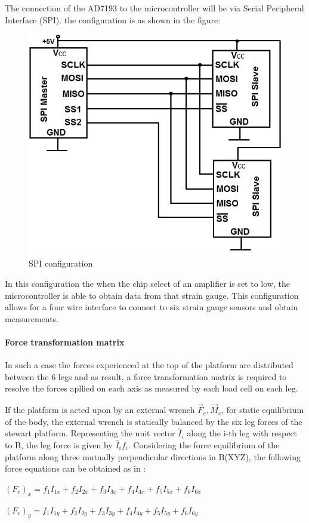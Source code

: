 The connection of the AD7193 to the microcontroller will be via Serial Peripheral Interface (SPI). the configuration is as shown in the figure:
\begin{center}
\begin{figure}
\centering
\includegraphics[width=0.55\linewidth]{Figures/SPI}
\caption[SPI configuration]{SPI configuration}
\end{figure}
\end{center}
In this configuration the when the chip select of an amplifier is set to low, the microcontroller is able to obtain data from that strain gauge. This configuration allows for a four wire interface to connect to six strain gauge sensors and obtain measurements.

\paragraph{Force transformation matrix} 
In such a case the forces experienced at the top of the platform are distributed between the 6 legs and as result, a force transformation matrix is required to resolve the forces apllied on each axis as measured by each load cell on each leg. 

If the platform is acted upon by an external wrench {$\vec{F}_e, \vec{M}_e$}, for static equilibrium of the body, the external wrench is statically balanced by the six leg forces of the stewart platform. Representing the unit vector $\hat{I}_i$ along the i-th leg with respect to B, the leg force is given  by $\hat{I}_if_i$. Considering the force equilibrium of the platform along  three mutually perpendicular directions in B(XYZ), the following force equations can be obtained as in \cite{dwarakanath_design_2001}:

$(F_e)_x = f_1I_{1x} + f_2I_{2x} + f_3I_{3x} + f_4I_{4x} + f_5I_{5x} + f_6I_{6x}$

$(F_e)_y = f_1I_{1y} + f_2I_{2y} + f_3I_{3y} + f_4I_{4y} + f_5I_{5y} + f_6I_{6y}$

